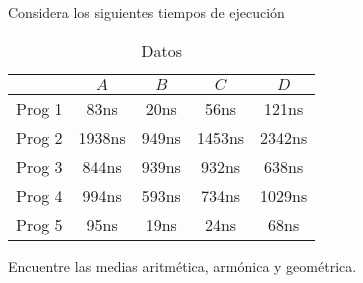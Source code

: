 \documentclass[]{article}
\begin{document}
    Considera los siguientes tiempos de ejecución

    \begin{table}[H]
        \centering
        \caption{Datos}
        \begin{tabular}{|c|c|c|c|c|}
            \hline
             & $A$ & $B$ & $C$ & $D$ \\
            \hline
            Prog 1 & 83ns & 20ns & 56ns & 121ns \\
            Prog 2 & 1938ns & 949ns & 1453ns & 2342ns \\
            Prog 3 & 844ns & 939ns & 932ns & 638ns \\
            Prog 4 & 994ns & 593ns & 734ns & 1029ns \\
            Prog 5 & 95ns & 19ns & 24ns & 68ns \\
            \hline
        \end{tabular}
    \end{table}
    Encuentre las medias aritmética, armónica y geométrica.
\end{document}
